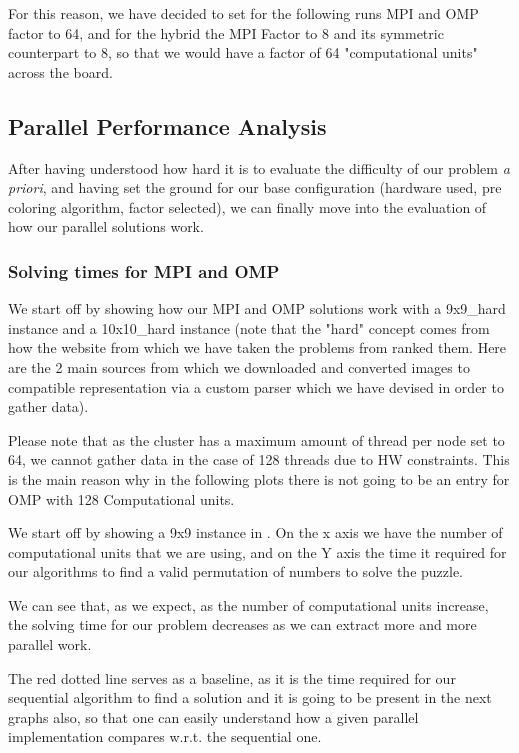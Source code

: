 For this reason, we have decided to set for the following runs MPI and OMP factor to 64, and for the hybrid the MPI Factor to 8 and its symmetric counterpart to 8, so that we would have a factor of 64 "computational units" across the board.


\subsection{Parallel Performance Analysis}

After having understood how hard it is to evaluate the difficulty of our problem \textit{a priori}, and having set the ground for our base configuration (hardware used, pre coloring algorithm, factor selected), we can finally move into the evaluation of how our parallel solutions work.

\subsubsection{Solving times for MPI and OMP}
\label{subsubsec:solving_times_mpi_omp}

We start off by showing how our MPI and OMP solutions work with a 9x9\_hard instance and a 10x10\_hard instance (note that the "hard" concept comes from how the website from which we have taken the problems from ranked them. Here are the 2 main sources from which we downloaded \cite{puzzle_futoshiki,puddelbee} and converted images to compatible representation via a custom parser which we have devised in order to gather data).

Please note that as the cluster has a maximum amount of thread per node set to 64, we cannot gather data in the case of 128 threads due to HW constraints. This is the main reason why in the following plots there is not going to be an entry for OMP with 128 Computational units.


We start off by showing a 9x9 instance in . On the x axis we have the number of computational units that we are using, and on the Y axis the time it required for our algorithms to find a valid permutation of numbers to solve the puzzle.

We can see that, as we expect, as the number of computational units increase, the solving time for our problem decreases as we can extract more and more parallel work.

The red dotted line serves as a baseline, as it is the time required for our sequential algorithm to find a solution and it is going to be present in the next graphs also, so that one can easily understand how a given parallel implementation compares w.r.t. the sequential one.

